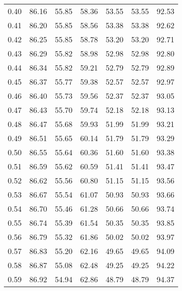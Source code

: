 \begin{tabular}{|c|c|c|c|c|c|c|}
      0.40 &     86.16 &     55.85 &      58.36 &   53.55 &      53.55 &         92.53 \\
      0.41 &     86.20 &     55.85 &      58.56 &   53.38 &      53.38 &         92.62 \\
      0.42 &     86.25 &     55.85 &      58.78 &   53.20 &      53.20 &         92.71 \\
      0.43 &     86.29 &     55.82 &      58.98 &   52.98 &      52.98 &         92.80 \\
      0.44 &     86.34 &     55.82 &      59.21 &   52.79 &      52.79 &         92.89 \\
      0.45 &     86.37 &     55.77 &      59.38 &   52.57 &      52.57 &         92.97 \\
      0.46 &     86.40 &     55.73 &      59.56 &   52.37 &      52.37 &         93.05 \\
      0.47 &     86.43 &     55.70 &      59.74 &   52.18 &      52.18 &         93.13 \\
      0.48 &     86.47 &     55.68 &      59.93 &   51.99 &      51.99 &         93.21 \\
      0.49 &     86.51 &     55.65 &      60.14 &   51.79 &      51.79 &         93.29 \\
      0.50 &     86.55 &     55.64 &      60.36 &   51.60 &      51.60 &         93.38 \\
      0.51 &     86.59 &     55.62 &      60.59 &   51.41 &      51.41 &         93.47 \\
      0.52 &     86.62 &     55.56 &      60.80 &   51.15 &      51.15 &         93.56 \\
      0.53 &     86.67 &     55.54 &      61.07 &   50.93 &      50.93 &         93.66 \\
      0.54 &     86.70 &     55.46 &      61.28 &   50.66 &      50.66 &         93.74 \\
      0.55 &     86.74 &     55.39 &      61.54 &   50.35 &      50.35 &         93.85 \\
      0.56 &     86.79 &     55.32 &      61.86 &   50.02 &      50.02 &         93.97 \\
      0.57 &     86.83 &     55.20 &      62.16 &   49.65 &      49.65 &         94.09 \\
      0.58 &     86.87 &     55.08 &      62.48 &   49.25 &      49.25 &         94.22 \\
      0.59 &     86.92 &     54.94 &      62.86 &   48.79 &      48.79 &         94.37 \\

\end{tabular}
